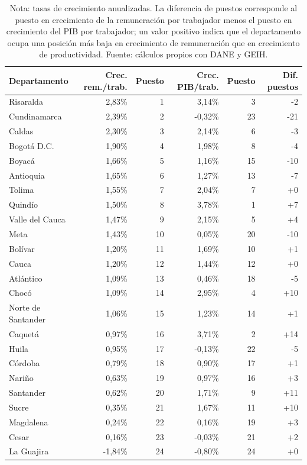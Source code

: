 \begin{table}[H]
\centering
\caption{Crecimiento departamental de remuneraci\'on y PIB por trabajador, 2010--2024pr}
\label{tab:pib_geih_productividad_departamento_remuneracion_crecimientos}
\scriptsize
\begin{tabular}{lrrrrr}
\toprule
Departamento & Crec. rem./trab. & Puesto & Crec. PIB/trab. & Puesto & Dif. puestos \\
\midrule
Risaralda & 2,83\% & 1 & 3,14\% & 3 & -2 \\
Cundinamarca & 2,39\% & 2 & -0,32\% & 23 & -21 \\
Caldas & 2,30\% & 3 & 2,14\% & 6 & -3 \\
Bogotá D.C. & 1,90\% & 4 & 1,98\% & 8 & -4 \\
Boyacá & 1,66\% & 5 & 1,16\% & 15 & -10 \\
Antioquia & 1,65\% & 6 & 1,27\% & 13 & -7 \\
Tolima & 1,55\% & 7 & 2,04\% & 7 & +0 \\
Quindío & 1,50\% & 8 & 3,78\% & 1 & +7 \\
Valle del Cauca & 1,47\% & 9 & 2,15\% & 5 & +4 \\
Meta & 1,43\% & 10 & 0,05\% & 20 & -10 \\
Bolívar & 1,20\% & 11 & 1,69\% & 10 & +1 \\
Cauca & 1,20\% & 12 & 1,44\% & 12 & +0 \\
Atlántico & 1,09\% & 13 & 0,46\% & 18 & -5 \\
Chocó & 1,09\% & 14 & 2,95\% & 4 & +10 \\
Norte de Santander & 1,06\% & 15 & 1,23\% & 14 & +1 \\
Caquetá & 0,97\% & 16 & 3,71\% & 2 & +14 \\
Huila & 0,95\% & 17 & -0,13\% & 22 & -5 \\
Córdoba & 0,79\% & 18 & 0,90\% & 17 & +1 \\
Nariño & 0,63\% & 19 & 0,97\% & 16 & +3 \\
Santander & 0,62\% & 20 & 1,71\% & 9 & +11 \\
Sucre & 0,35\% & 21 & 1,67\% & 11 & +10 \\
Magdalena & 0,24\% & 22 & 0,16\% & 19 & +3 \\
Cesar & 0,16\% & 23 & -0,03\% & 21 & +2 \\
La Guajira & -1,84\% & 24 & -0,80\% & 24 & +0 \\
\bottomrule
\end{tabular}
\caption*{\footnotesize Nota: tasas de crecimiento anualizadas. La diferencia de puestos corresponde al puesto en crecimiento de la remuneraci\'on por trabajador menos el puesto en crecimiento del PIB por trabajador; un valor positivo indica que el departamento ocupa una posici\'on m\'as baja en crecimiento de remuneraci\'on que en crecimiento de productividad. Fuente: c\'alculos propios con DANE y GEIH.}
\end{table}